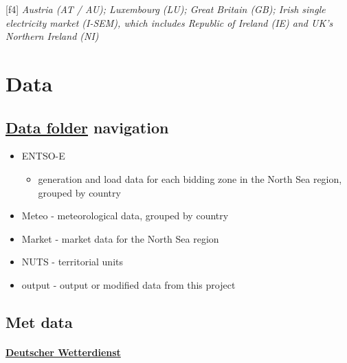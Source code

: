 {[}f4{]} \emph{Austria (AT / AU); Luxembourg (LU); Great Britain (GB);
Irish single electricity market (I-SEM), which includes Republic of
Ireland (IE) and UK's Northern Ireland (NI)}

\hypertarget{data}{%
\section{Data}\label{data}}

\hypertarget{data-folder-navigation}{%
\subsection{\texorpdfstring{\href{https://drive.google.com/drive/folders/1_3Y30j_c-4iai0WuhcrysXHYdZ4F2AKB}{Data
folder}
navigation}{Data folder navigation}}\label{data-folder-navigation}}

\begin{itemize}
\tightlist
\item
  ENTSO-E

  \begin{itemize}
  \tightlist
  \item
    generation and load data for each bidding zone in the North Sea
    region, grouped by country
  \end{itemize}
\item
  Meteo - meteorological data, grouped by country
\item
  Market - market data for the North Sea region
\item
  NUTS - territorial units
\item
  output - output or modified data from this project
\end{itemize}

\hypertarget{met-data}{%
\subsection{Met data}\label{met-data}}

\hypertarget{deutscher-wetterdienst}{%
\paragraph{\texorpdfstring{\href{https://www.dwd.de/EN/climate_environment/cdc/cdc_node.html}{Deutscher
Wetterdienst}}{Deutscher Wetterdienst}}\label{deutscher-wetterdienst}}

